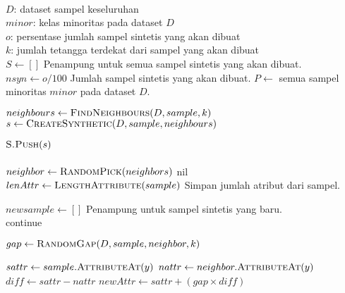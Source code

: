 \begin{center}
	\label{alg:lnsmote}
	\begin{algorithmic}[1]
\Require \\
$ D $: dataset sampel keseluruhan \\
$ minor $: kelas minoritas pada dataset $D$ \\
$ o $: persentase jumlah sampel sintetis yang akan dibuat \\
$ k $: jumlah tetangga terdekat dari sampel yang akan dibuat
\\
	\State $ S \gets [] $
	\Comment Penampung untuk semua sampel sintetis yang akan dibuat.
	\State $ nsyn \gets o/100 $
	\Comment Jumlah sampel sintetis yang akan dibuat.
	\State $ P \gets $ semua sampel minoritas $minor$ pada dataset $D$.

		\State $ neighbours \gets \Call{FindNeighbours}{D, sample, k} $
			\State $ s \gets \Call{CreateSynthetic}{D, sample, neighbours} $

				\State $ \Call{S.Push}{s} $
			\EndIf
		\EndFor
	\EndFor
	\\
	\State {}
\EndFunction
\\
	\State $ neighbor \gets \Call{RandomPick}{neighbors} $
		\State \Return nil
	\EndIf
	\\
	\State $ lenAttr \gets \Call{LengthAttribute}{sample} $
	\Comment Simpan jumlah atribut dari sampel.

	\State $ newsample \gets [] $
	\Comment Penampung untuk sampel sintetis yang baru.
	\\
			\State continue
		\EndIf

		\State $ gap \gets \Call{RandomGap}{D, sample, neighbor, k} $

		\State $ sattr \gets sample.\Call{AttributeAt}{y} $
		\State $ nattr \gets neighbor.\Call{AttributeAt}{y} $
		\State $ diff \gets sattr - nattr $
		\State $ newAttr \gets sattr + (gap \times diff) $


\end{algorithmic}
\end{center}
